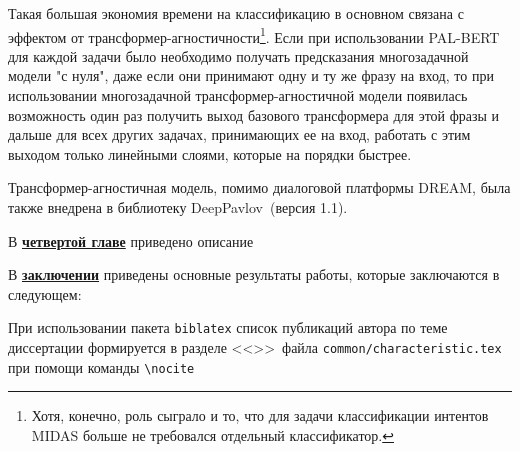Такая большая экономия времени на классификацию в основном связана с эффектом от трансформер-агностичности\footnote{Хотя, конечно, роль сыграло и то, что для задачи классификации интентов MIDAS больше не требовался отдельный классификатор.}. Если при использовании PAL-BERT для каждой задачи было необходимо получать предсказания многозадачной модели "с нуля", даже если они принимают одну и ту же фразу на вход, то при использовании многозадачной трансформер-агностичной модели появилась возможность один раз получить выход базового трансформера для этой фразы и дальше для всех других задачах, принимающих ее на вход, работать с этим выходом только линейными слоями, которые на порядки быстрее. 

Трансформер-агностичная модель, помимо диалоговой платформы DREAM, была также внедрена в библиотеку DeepPavlov~\cite{dp_2023}(версия 1.1).


В \underline{\textbf{четвертой главе}} приведено описание

В \underline{\textbf{заключении}} приведены основные результаты работы, которые заключаются в следующем:


При использовании пакета \verb!biblatex! список публикаций автора по теме
диссертации формируется в разделе <<\publications>>\ файла
\verb!common/characteristic.tex!  при помощи команды \verb!\nocite!

